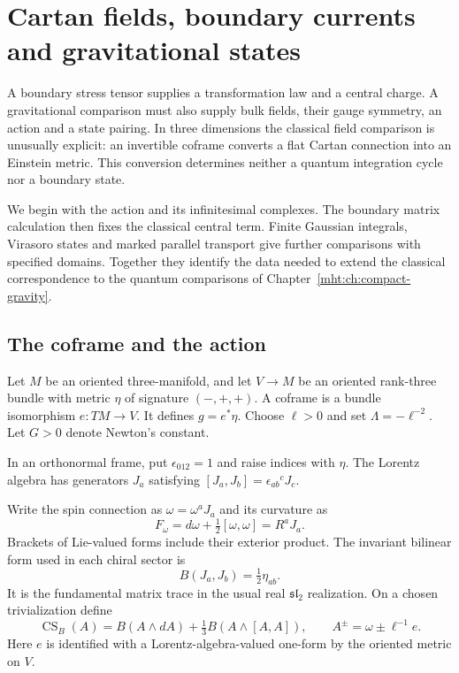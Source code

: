\chapter{Cartan fields, boundary currents and gravitational states}
\label{mht:ch:gravitational-models}

A boundary stress tensor supplies a transformation law and a central
charge. A gravitational comparison must also supply bulk fields,
their gauge symmetry, an action and a state pairing. In three
dimensions the classical field comparison is unusually explicit:
an invertible coframe converts a flat Cartan connection into an
Einstein metric. This conversion determines neither a quantum
integration cycle nor a boundary state.

We begin with the action and its infinitesimal complexes. The
boundary matrix calculation then fixes the classical central term.
Finite Gaussian integrals, Virasoro states and marked parallel
transport give further comparisons with specified domains. Together
they identify the data needed to extend the classical correspondence
to the quantum comparisons of Chapter~\ref{mht:ch:compact-gravity}.

\section{The coframe and the action}

Let $M$ be an oriented three-manifold, and let $V\to M$ be an
oriented rank-three bundle with metric $\eta$ of signature $(-,+,+)$.
A coframe is a bundle isomorphism $e:TM\to V$.
It defines $g=e^*\eta$.
Choose $\ell>0$ and set $\Lambda=-\ell^{-2}$.
Let $G>0$ denote Newton's constant.

In an orthonormal frame, put $\epsilon_{012}=1$ and raise indices
with $\eta$. The Lorentz algebra has generators $J_a$ satisfying
$[J_a,J_b]=\epsilon_{ab}{}^cJ_c$.

Write the spin connection as $\omega=\omega^aJ_a$ and its curvature as
\[
 F_\omega=d\omega+\tfrac12[\omega,\omega]=R^aJ_a.
\]
Brackets of Lie-valued forms include their exterior product.
The invariant bilinear form used in each chiral sector is
\[
 B(J_a,J_b)=\tfrac12\eta_{ab}.
\]
It is the fundamental matrix trace in the usual real
$\mathfrak{sl}_2$ realization. On a chosen trivialization define
\[
 \operatorname{CS}_B(A)
 =B(A\wedge dA)+\tfrac13B(A\wedge[A,A]),
 \qquad A^\pm=\omega\pm\ell^{-1}e.
\]
Here $e$ is identified with a Lorentz-algebra-valued one-form by
the oriented metric on $V$.

